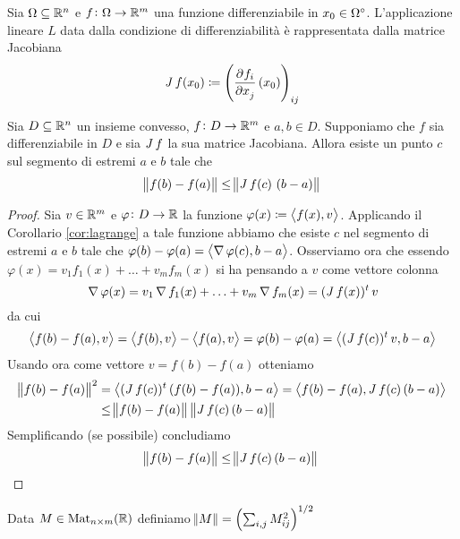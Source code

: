\begin{definition}
	Sia $ \Omega \subseteq \R^n $ e $ f \colon \Omega \to \R^m $ una funzione differenziabile in $ x_0 \in \ouv{\Omega} $. L'applicazione lineare $ L $ data dalla condizione di differenziabilità è rappresentata dalla matrice Jacobiana
	\begin{equation}
		\jac{f}(x_0) \coloneqq \left(\dpd{f_i}{x_j}(x_0)\right)_{ij}
	\end{equation}
\end{definition}

\begin{thm}
	Sia $ D \subseteq \R^n $ un insieme convesso, $ f \colon D \to \R^m $ e $ a, b \in D $. Supponiamo che $ f $ sia differenziabile in $ D $ e sia $ \jac{f} $ la sua matrice Jacobiana. Allora esiste un punto $ c $ sul segmento di estremi $ a $ e $ b $ tale che 
	\begin{equation}
		\norm{f(b) - f(a)} \leq \norm{\jac{f}(c) \ (b - a)}
	\end{equation}
\end{thm}
%
\begin{proof}
	Sia $ v \in \R^m $ e $ \varphi \colon D \to \R $ la funzione $ \varphi(x) \coloneqq \sp{f(x)}{v} $. Applicando il Corollario \ref{cor:lagrange} a tale funzione abbiamo che esiste $ c $ nel segmento di estremi $ a $ e $ b $ tale che $ \varphi(b) - \varphi(a) = \sp{\grad{\varphi}(c)}{b - a} $. Osserviamo ora che essendo $ \varphi(x) = v_1 f_1(x) + \ldots + v_m f_m(x) $ si ha pensando a $ v $ come vettore colonna
	\[
		\grad{\varphi}(x) = v_1 \grad{f_1}(x) + \ldots + v_m \grad{f_m}(x) = (\jac{f}(x))^t \, v
	\]
	da cui
	\[
		\sp{f(b) - f(a)}{v} = \sp{f(b)}{v} - \sp{f(a)}{v} = \varphi(b) - \varphi(a) = \sp{(\jac{f}(c))^t \, v}{b - a}
	\]
	Usando ora come vettore $ v = f(b) - f(a) $ otteniamo
	\begin{align*}
		\norm{f(b) - f(a)}^2 & = \sp{(\jac{f}(c))^t \, (f(b) - f(a))}{b - a} = \sp{f(b) - f(a)}{\jac{f}(c) \, (b - a)} \\
		& \leq \norm{f(b) - f(a)} \, \norm{\jac{f}(c) \, (b - a)}
	\end{align*}
	Semplificando (se possibile) concludiamo 
	\[
		\norm{f(b) - f(a)} \leq \norm{\jac{f}(c) \, (b - a)} \qedhere
	\]
\end{proof}

\begin{definition}
	Data $ M \in \mathrm{Mat}_{n \times m}(\R) $ definiamo $ \norm{M} = \left(\sum_{i, j} M_{ij}^2\right)^{1/2} $
\end{definition}

